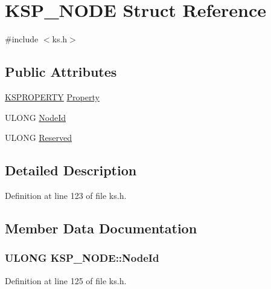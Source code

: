 \hypertarget{struct_k_s_p___n_o_d_e}{}\section{K\+S\+P\+\_\+\+N\+O\+DE Struct Reference}
\label{struct_k_s_p___n_o_d_e}


{\ttfamily \#include $<$ks.\+h$>$}

\subsection*{Public Attributes}
\begin{DoxyCompactItemize}
\item 
\hyperlink{ks_8h_a4392f77c74e868d813d46c39ada4d660}{K\+S\+P\+R\+O\+P\+E\+R\+TY} \hyperlink{struct_k_s_p___n_o_d_e_a0e2b497a39af6ec103993e2b548a9069}{Property}
\item 
U\+L\+O\+NG \hyperlink{struct_k_s_p___n_o_d_e_ac0d2a45bb00826c5b325bd19ddd0df7d}{Node\+Id}
\item 
U\+L\+O\+NG \hyperlink{struct_k_s_p___n_o_d_e_abd97f57056040865bdf319f9a43030c7}{Reserved}
\end{DoxyCompactItemize}


\subsection{Detailed Description}


Definition at line 123 of file ks.\+h.



\subsection{Member Data Documentation}
\subsubsection[{\texorpdfstring{Node\+Id}{NodeId}}]{\setlength{\rightskip}{0pt plus 5cm}U\+L\+O\+NG K\+S\+P\+\_\+\+N\+O\+D\+E\+::\+Node\+Id}\hypertarget{struct_k_s_p___n_o_d_e_ac0d2a45bb00826c5b325bd19ddd0df7d}{}\label{struct_k_s_p___n_o_d_e_ac0d2a45bb00826c5b325bd19ddd0df7d}


Definition at line 125 of file ks.\+h.

